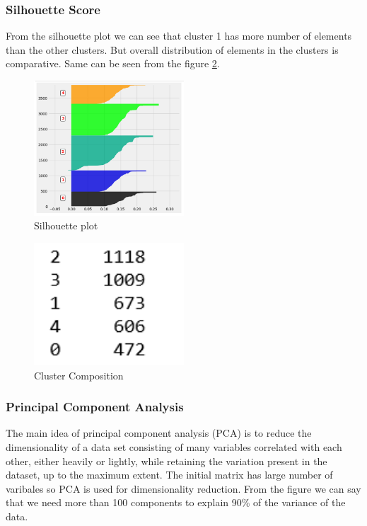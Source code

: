 \subsubsection*{Silhouette  Score}

From the silhouette plot we can see that cluster 1 has more number of elements than the other clusters. But overall distribution of elements in the clusters is comparative. Same can be seen from the figure \ref{3.4}.

\begin{figure}[h]
\caption{Silhouette plot}
\label{3.3}
\centering
\includegraphics[width=0.5\textwidth]{images/3_3.PNG}
\end{figure}

\begin{figure}[h]
\caption{Cluster Composition}
\label{3.4}
\centering
\includegraphics[width=0.5\textwidth]{images/3_4.PNG}
\end{figure}

\subsubsection*{Principal Component Analysis}

The main idea of principal component analysis (PCA) is to reduce the dimensionality of a data set consisting of many variables correlated with each other, either heavily or lightly, while retaining the variation present in the dataset, up to the maximum extent. The initial matrix has large number of varibales so PCA is used for dimensionality reduction. From the figure we can say that we need more than 100 components to explain 90\% of the variance of the data.\\

